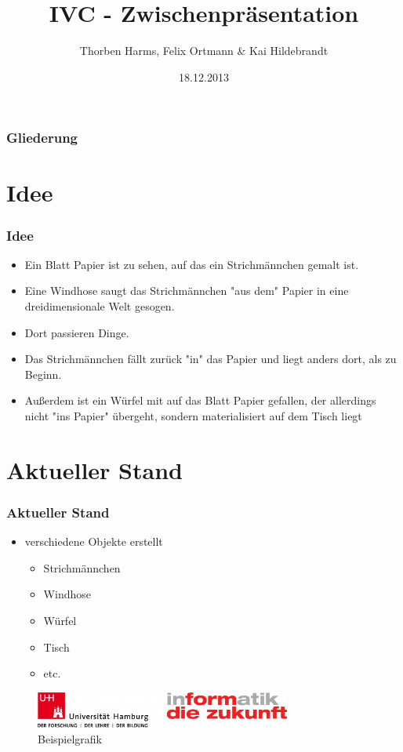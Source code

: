 \documentclass[compress]{beamer}
\title{IVC - Zwischenpräsentation}
\author{Thorben Harms, Felix Ortmann \& Kai Hildebrandt}
\institute{Fachbereich Informatik\\Fakultät für Mathematik, Informatik und Naturwissenschaften\\Universität Hamburg}
\date{18.12.2013}
\begin{document}
\begin{frame}
	\titlepage
\end{frame}

\begin{frame}
	\frametitle{Gliederung}

	\tableofcontents[hidesubsections]
\end{frame}

\section{Idee}

\begin{frame}
	\frametitle{Idee}

	\begin{itemize}
	  \item<+-> Ein Blatt Papier ist zu sehen, auf das ein Strichmännchen gemalt ist.
	  \item<+-> Eine Windhose saugt das Strichmännchen "aus dem" Papier in eine dreidimensionale Welt gesogen.
	  \item<+-> Dort passieren Dinge.
	  \item<+-> Das Strichmännchen fällt zurück "in" das Papier und liegt anders dort, als zu Beginn.
	  \item<+-> Außerdem ist ein Würfel mit auf das Blatt Papier gefallen, der allerdings nicht "ins Papier" übergeht, sondern materialisiert auf dem Tisch liegt
	\end{itemize}
\end{frame}

\section{Aktueller Stand}

\begin{frame}
	\frametitle{Aktueller Stand}
	
	\begin{itemize}
	  \item verschiedene Objekte erstellt
	  \begin{itemize}
	    \item Strichmännchen
	    \item Windhose
	    \item Würfel
	    \item Tisch
	    \item etc.
	  \end{itemize}
	\end{itemize}
	
	\begin{figure}
		\begin{center}
			\includegraphics[width=0.75\textwidth]{logo.jpg}
		\end{center}
		\caption{Beispielgrafik}
		\label{fig:logo}
	\end{figure}

\end{frame}
\end{document}

